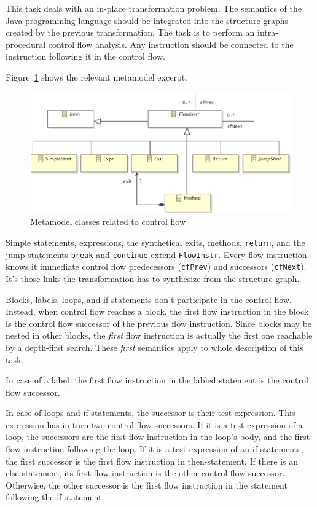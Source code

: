 \documentclass[11pt]{article}
\begin{document}
This task deals with an in-place transformation problem.  The semantics of the
Java programming language should be integrated into the structure graphs
created by the previous transformation.  The task is to perform an
intra-procedural control flow analysis.  Any instruction should be connected to
the instruction following it in the control flow.

Figure~\ref{fig:control-flow-mm} shows the relevant metamodel excerpt.

\begin{figure}[h!]
  \centering
  \includegraphics[width=0.8\linewidth]{../metamodel/ControlFlowGraph}
  \caption{Metamodel classes related to control flow}
  \label{fig:control-flow-mm}
\end{figure}

Simple statements, expressions, the synthetical exits, methods, \verb|return|,
and the jump statements \verb|break| and \verb|continue| extend
\verb|FlowInstr|.  Every flow instruction knows it immediate control flow
predecessors (\verb|cfPrev|) and successors (\verb|cfNext|).  It's those links
the transformation has to synthesize from the structure graph.

Blocks, labels, loops, and if-statements don't participate in the control flow.
Instead, when control flow reaches a block, the first flow instruction in the
block is the control flow successor of the previous flow instruction.  Since
blocks may be nested in other blocks, the \emph{first} flow instruction is
actually the first one reachable by a depth-first search.  These \emph{first}
semantics apply to whole description of this task.

In case of a label, the first flow instruction in the labled statement is the
control flow successor.

In case of loops and if-statements, the successor is their test expression.
This expression has in turn two control flow successors.  If it is a test
expression of a loop, the successors are the first flow instruction in the
loop's body, and the first flow instruction following the loop.  If it is a
test expression of an if-statements, the first successor is the first flow
instruction in then-statement.  If there is an else-statement, its first flow
instruction is the other control flow successor.  Otherwise, the other
successor is the first flow instruction in the statement following the
if-statement.
\end{document}
